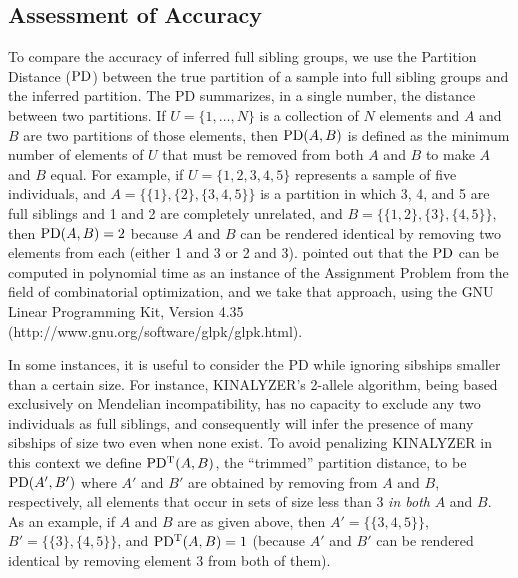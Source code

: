 \documentclass[11pt]{article}
\begin{document}
\subsection{Assessment of Accuracy}
To compare the accuracy of inferred full sibling groups,  we use the Partition Distance ($\mathrm{PD}$) between 
the true partition of a sample into full sibling groups and the inferred partition. The PD summarizes, 
in a single number, the distance between two partitions.  If $U=\{1,\ldots,N\}$ is a collection of $N$ 
elements and $A$ and $B$ are two partitions of those elements, then $\mathrm{PD}(A,B)$ is defined as the 
minimum number of elements of $U$ that must be removed from both $A$ and $B$ to make $A$ and $B$ equal.  
For example, if $U=\{1,2,3,4,5\}$ represents a sample of five individuals, and $A=\{\{1\},\{2\},
\{3,4,5\}\}$ is a partition in which 3, 4, and 5 are full siblings and 1 and 2 are completely 
unrelated, and $B=\{\{1,2\},\{3\},\{4,5\}\}$, then $\mathrm{PD}(A,B) = 2$ because $A$ and $B$ can be rendered 
identical by removing two elements from each (either 1 and 3 or 2 and 3).  \citet{gusfield02} pointed 
out that the $\mathrm{PD}$ can be computed in polynomial time as an instance of the Assignment Problem from the 
field of combinatorial optimization, and we take that approach, using the GNU Linear Programming Kit, 
Version 4.35 (http://www.gnu.org/software/glpk/glpk.html).

In some instances, it is useful to consider the PD while ignoring sibships smaller than a certain size.  
For instance, KINALYZER's 2-allele algorithm, being based exclusively on Mendelian incompatibility, has 
no capacity to exclude any two individuals as full siblings, and consequently will infer the presence 
of many sibships of size two even when none exist.  To avoid penalizing KINALYZER in this context we 
define $\mathrm{PD^T}(A,B)$, the ``trimmed'' partition distance, to be $\mathrm{PD}(A',B')$ where $A'$ and $B'$ are 
obtained by removing from $A$ and $B$, respectively, all elements that occur in sets of size less than 
3 {\em in both} $A$ and $B$. As an example, if $A$ and $B$ are as given above, then $A'=\{\{3,4,5\}\}$, 
$B'=\{\{3\},\{4,5\}\}$, and $\mathrm{PD^T}(A,B)=1$ (because $A'$ and $B'$ can be rendered identical by removing 
element 3 from both of them).  
\end{document}
